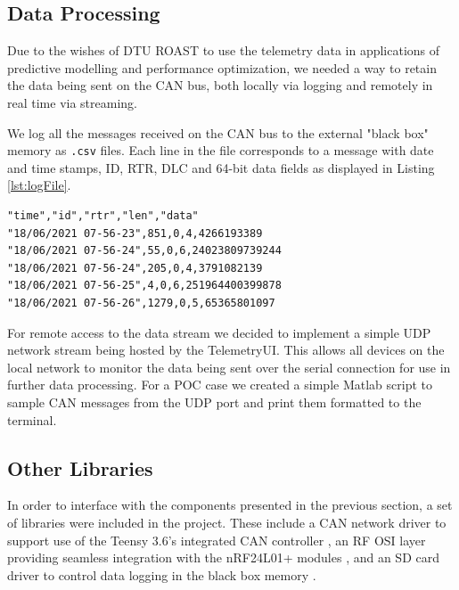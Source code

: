 \documentclass[a4paper,conference]{IEEEtran}
\begin{document}
\subsection{Data Processing} %
Due to the wishes of DTU ROAST to use the telemetry data in applications of predictive modelling and performance optimization, we needed a way to retain the data being sent on the CAN bus, both locally via logging and remotely in real time via streaming. 

We log all the messages received on the CAN bus to the external "black box" memory as \texttt{.csv} files. Each line in the file corresponds to a message with date and time stamps, ID, RTR, DLC and 64-bit data fields as displayed in Listing \ref{lst:logFile}.

\begin{lstlisting}[caption={Example of a \texttt{.csv} log file with random data.},captionpos=b,label={lst:logFile}]
"time","id","rtr","len","data"
"18/06/2021 07-56-23",851,0,4,4266193389
"18/06/2021 07-56-24",55,0,6,24023809739244
"18/06/2021 07-56-24",205,0,4,3791082139
"18/06/2021 07-56-25",4,0,6,251964400399878
"18/06/2021 07-56-26",1279,0,5,65365801097
\end{lstlisting}

For remote access to the data stream we decided to implement a simple UDP network stream being hosted by the TelemetryUI. This allows all devices on the local network to monitor the data being sent over the serial connection for use in further data processing. For a POC case we created a simple Matlab script to sample CAN messages from the UDP port and print them formatted to the terminal. 

\subsection{Other Libraries}
In order to interface with the components presented in the previous section, a set of libraries were included in the project. These include a CAN network driver to support use of the Teensy 3.6's integrated CAN controller \cite{ACAN}, an RF OSI layer providing seamless integration with the nRF24L01+ modules \cite{nrfLib}, and an SD card driver to control data logging in the black box memory \cite{sdfatlib}. 


\end{document}
